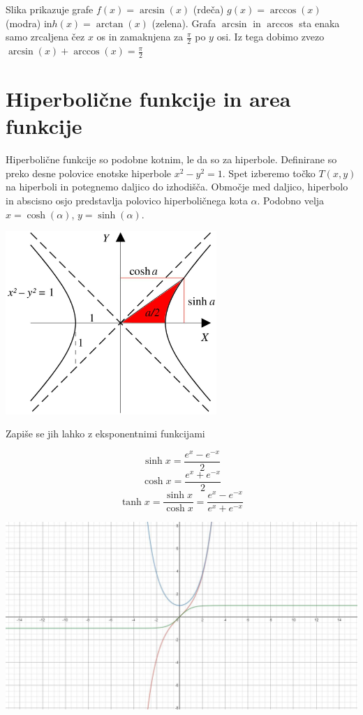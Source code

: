 \documentclass[12pt]{report}
\begin{document}
Slika prikazuje grafe $f(x)=\arcsin(x)$ (rdeča) $g(x)=\arccos(x)$ (modra) in$ h(x)=\arctan(x)$ (zelena). Grafa $\arcsin$ in $\arccos$ sta enaka samo zrcaljena čez $x$ os in zamaknjena za $\frac{\pi}{2}$ po $y$ osi. Iz tega dobimo zvezo 
$\arcsin(x)+\arccos(x)=\frac{\pi}{2}$

\section*{Hiperbolične funkcije in area funkcije}
Hiperbolične funkcije so podobne kotnim, le da so za hiperbole. Definirane so preko desne polovice enotske hiperbole $x^2-y^2=1$. Spet izberemo točko $T(x, y)$ na hiperboli in potegnemo daljico do izhodišča. Območje med daljico, hiperbolo in abscisno osjo predstavlja polovico hiperboličnega kota $\alpha$. Podobno velja $x=\cosh(\alpha)$, $y=\sinh(\alpha)$. 

 \begin{slika}[H]
  \centering
  \includegraphics[width = 8cm]{22}
\end{slika}

Zapiše se jih lahko z eksponentnimi funkcijami
 
 \[\sinh x=\frac{e^x-e^{-x}}{2}\]
 \[\cosh x=\frac{e^x+e^{-x}}{2}\]
 \[\tanh x= \frac{\sinh x}{\cosh x}= \frac{e^x-e^{-x}}{e^x+e^{-x}}\]
 
  \begin{slika}[H]
  \centering
  \includegraphics[width = \textwidth]{26}
\end{slika}
 
\end{document}
